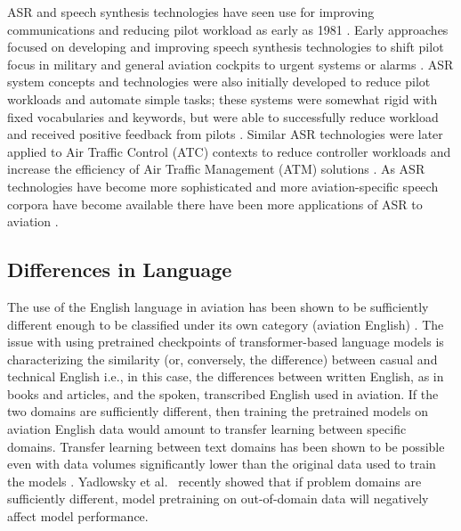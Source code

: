 \documentclass[12pt]{article}
\begin{document}
ASR and speech synthesis technologies have seen use for improving communications and reducing pilot workload as early as 1981
\cite{money_aural_1981,north_application_1984,north_systems_1984,mayer_electronic_1981}. Early approaches focused on developing and improving speech
synthesis technologies to shift pilot focus in military and general aviation cockpits to urgent systems or alarms
\cite{mayer_electronic_1981,money_aural_1981,mosko_clear_1981}. ASR system concepts and technologies were also initially developed to reduce pilot
workloads and automate simple tasks; these systems were somewhat rigid with fixed vocabularies and keywords, but were able to successfully reduce
workload and received positive feedback from pilots \cite{north_application_1984,cotton_development_1983}. Similar ASR technologies were later applied
to Air Traffic Control (ATC) contexts to reduce controller workloads and increase the efficiency of Air Traffic Management (ATM) solutions
\cite{schafer_context-sensitive_2000,lechner_voice_2002,ragnarsdottir_language_2003,cordero_automated_2012}. As ASR technologies have become more
sophisticated and more aviation-specific speech corpora have become available
\cite{godfrey_air_1994,smidl_air_2019,hofbauer_atcosim_2008,szoke_detecting_2021,segura_hiwire_2007,graglia_vocalise_2005,delpech_real-life_2018,zuluaga-gomez_atco2_2023}
there have been more applications of ASR to aviation
\cite{moere_implementing_2009,gurluk_assistant_2015,helmke_assistant-based_2015,helmke_machine_2020,helmke_readback_2021,kleinert_automated_2021,badrinath_automatic_2022,shi_end--end_2022,xiao_speech_2022,zuluaga-gomez_atco2_2023}.


\subsection{Differences in Language}
The use of the English language in aviation has been shown to be sufficiently different enough to be classified under its own category (aviation
English) \cite{paltridge_handbook_2013}. The issue with using pretrained checkpoints of transformer-based language models is characterizing the
similarity (or, conversely, the difference) between casual and technical English i.e., in this case, the differences between written English, as in
books and articles, and the spoken, transcribed English used in aviation. If the two domains are sufficiently different, then training the pretrained
models on aviation English data would amount to transfer learning between specific domains. Transfer learning between text domains has been shown to
be possible even with data volumes significantly lower than the original data used to train the models \cite{raffel_exploring_2020}. Yadlowsky et
al.~\cite{yadlowsky_pretraining_2023} recently showed that if problem domains are sufficiently different, model pretraining on out-of-domain data will
negatively affect model performance.
\end{document}
